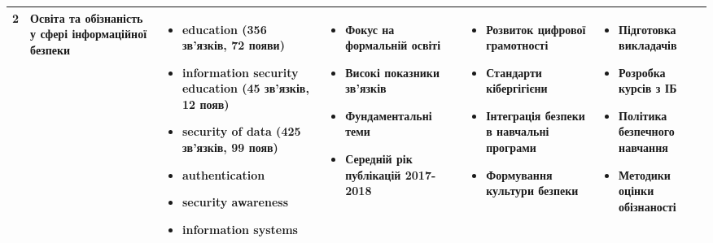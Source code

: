 {\begin{longtable}{|c|p{2.6cm}|p{3cm}|p{3.1cm}|p{3cm}|p{3cm}|}
\cellcolor{green!20}2 & 
\textbf{Освіта та обізнаність у сфері інформаційної безпеки} & 
\begin{itemize}
    \item education (356 зв'язків, 72 появи)
    \item information security education (45 зв'язків, 12 появ)
    \item security of data (425 зв'язків, 99 появ)
    \item authentication
    \item security awareness
    \item information systems
\end{itemize} & 
\begin{itemize}
    \item Фокус на формальній освіті
    \item Високі показники зв'язків
    \item Фундаментальні теми
    \item Середній рік публікацій 2017-2018
\end{itemize} & 
\begin{itemize}
    \item Розвиток цифрової грамотності
    \item Стандарти кібергігієни
    \item Інтеграція безпеки в навчальні програми
    \item Формування культури безпеки
\end{itemize} & 
\begin{itemize}
    \item Підготовка викладачів
    \item Розробка курсів з ІБ
    \item Політика безпечного навчання
    \item Методики оцінки обізнаності
\end{itemize} \\
\hline


\end{longtable}}
